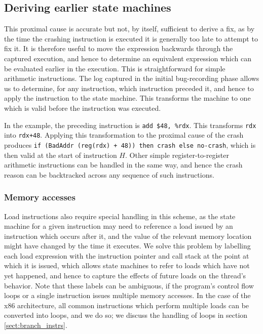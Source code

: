 \documentclass[10pt,twocolumn,preprint,natbib,authoryear]{sigplanconf}
\begin{document}
\subsection{Deriving earlier state machines}
This proximal cause is accurate but not, by itself, sufficient to
derive a fix, as by the time the crashing instruction is executed it
is generally too late to attempt to fix it.  It is therefore useful to
move the expression backwards through the captured execution, and
hence to determine an equivalent expression which can be evaluated
earlier in the execution.  This is straightforward for simple
arithmetic instructions.  The log captured in the initial
bug-recording phase allows us to determine, for any instruction, which
instruction preceded it, and hence to apply the instruction to the
state machine.  This transforms the machine to one which is valid
before the instruction was executed.

In the example, the preceding instruction is \verb|add $48, %rdx|.
This transforms \verb|rdx| into \verb|rdx+48|.  Applying this
transformation to the proximal cause of the crash produces
\verb|if (BadAddr (reg(rdx) + 48)) then crash else no-crash|, which is
then valid at the start of instruction $H$.  Other simple
register-to-register arithmetic instructions can be handled in the
same way, and hence the crash reason can be backtracked across any
sequence of such instructions.

\subsubsection{Memory accesses}

Load instructions also require special handling in this scheme, as the
state machine for a given instruction may need to reference a load
issued by an instruction which occurs after it, and the value of the
relevant memory location might have changed by the time it executes.
We solve this problem by labelling each load expression with the
instruction pointer and call stack at the point at which it is issued,
which allows state machines to refer to loads which have not yet
happened, and hence to capture the effects of future loads on the
thread's behavior.  Note that these labels can be ambiguous, if the
program's control flow loops or a single instruction issues multiple
memory accesses.  In the case of the x86 architecture, all common
instructions which perform multiple loads can be converted into loops,
and we do so; we discuss the handling of loops in section
\ref{sect:branch_instrs}.
\end{document}
